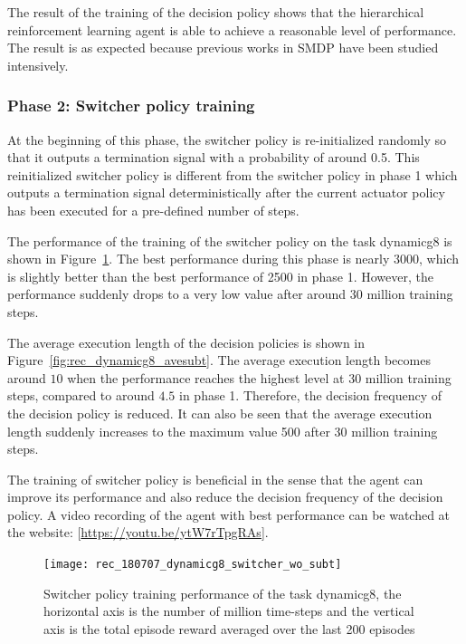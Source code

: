The result of the training of the decision policy shows that the hierarchical reinforcement learning agent is able to achieve a reasonable level of performance. The result is as expected because previous works in SMDP have been studied intensively.

\subsubsection{Phase 2: Switcher policy training}
At the beginning of this phase, the switcher policy is re-initialized randomly so that it outputs a termination signal with a probability of around 0.5. This reinitialized switcher policy is different from the switcher policy in phase 1 which outputs a termination signal deterministically after the current actuator policy has been executed for a pre-defined number of steps. 

The performance of the training of the switcher policy on the task dynamicg8 is shown in Figure~\ref{fig:rec_dynamicg8_switcher}. The best performance during this phase is nearly 3000, which is slightly better than the best performance of 2500 in phase 1. However, the performance suddenly drops to a very low value after around 30 million training steps.

The average execution length of the decision policies is shown in Figure~\ref{fig:rec_dynamicg8_avesubt}. The average execution length becomes around $10$ when the performance reaches the highest level at 30 million training steps, compared to around $4.5$ in phase 1. Therefore, the decision frequency of the decision policy is reduced. It can also be seen that the average execution length suddenly increases to the maximum value 500 after 30 million training steps.

The training of switcher policy is beneficial in the sense that the agent can improve its performance and also reduce the decision frequency of the decision policy. A video recording of the agent with best performance can be watched at  the website: [\url{https://youtu.be/ytW7rTpgRAs}].

\begin{figure}[!htbp]
	\centering
	\texttt{[image: rec\_180707\_dynamicg8\_switcher\_wo\_subt]}
	\caption{Switcher policy training performance of the task dynamicg8, the horizontal axis is the number of million time-steps and the vertical axis is the total episode reward averaged over the last 200 episodes}
	\label{fig:rec_dynamicg8_switcher}
\end{figure}

